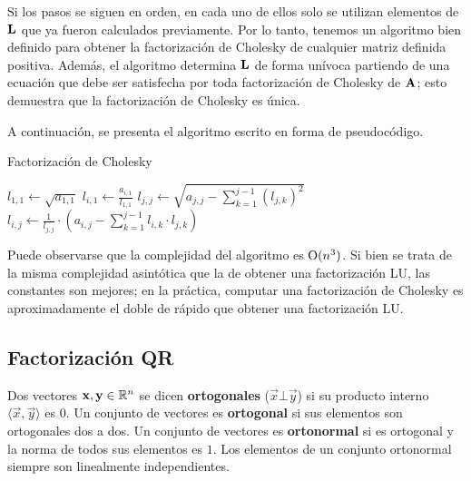Si los pasos se siguen en orden, en cada uno de ellos solo se utilizan
elementos de $\mathbf{L}$ que ya fueron calculados previamente. Por lo tanto,
tenemos un algoritmo bien definido para obtener la factorización de Cholesky
de cualquier matriz definida positiva.
Además, el algoritmo determina $\mathbf{L}$ de forma
unívoca partiendo de una ecuación que debe ser satisfecha por toda
factorización de Cholesky de $\mathbf{A}$; esto demuestra que la factorización
de Cholesky es única.

A continuación, se presenta el algoritmo escrito en forma de pseudocódigo.

\begin{algorithm}[H]
\caption{Factorización de Cholesky}
\label{algo:cholesky}


$\displaystyle l_{1,1} \gets \sqrt{a_{1,1}}$\;
 {
    $\displaystyle l_{i,1} \gets \frac{a_{i,1}}{l_{1,1}}$\;
}
 {
    $\displaystyle l_{j,j} \gets \sqrt{a_{j,j} -
        \sum_{k=1}^{j-1} (l_{j,k})^2}$\;
     {
        $\displaystyle l_{i,j} \gets \frac{1}{l_{j,j}} \cdot
        \left( a_{i,j} - \sum_{k=1}^{j-1} l_{i,k} \cdot l_{j,k} \right)$\;
    }
}
\end{algorithm}

Puede observarse que la complejidad del algoritmo es $\mathrm{O}(n^3)$. Si bien
se trata de la misma complejidad asintótica que la de obtener una
factorización LU, las constantes son mejores; en la práctica, computar
una factorización de Cholesky es aproximadamente el doble de rápido que
obtener una factorización LU.

\newpage
\subsection{Factorización QR}

Dos vectores $\mathbf{x}, \mathbf{y} \in \mathbb{R}^{n}$ se dicen \textbf{ortogonales}
($\vec{x} \bot \vec{y}$) si su producto interno
$\langle \vec{x},\vec{y} \rangle$ es $0$. Un conjunto de vectores
es \textbf{ortogonal} si sus elementos son ortogonales dos a dos. Un conjunto
de vectores es \textbf{ortonormal} si es ortogonal y la norma de todos sus
elementos es $1$. Los elementos de un conjunto ortonormal siempre son
linealmente independientes.

